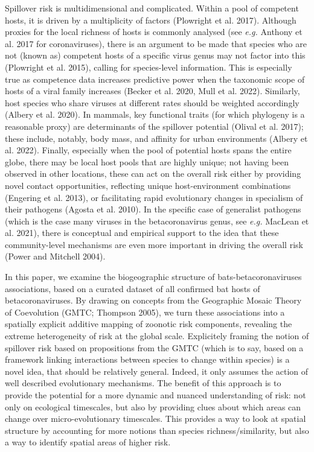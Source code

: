 \documentclass[11pt]{article}
\begin{document}
\vfill

\clearpage
\linenumbers
\pagestyle{normal}

Spillover risk is multidimensional and complicated. Within a pool of
competent hosts, it is driven by a multiplicity of factors (Plowright et
al. 2017). Although proxies for the local richness of hosts is commonly
analysed (see \emph{e.g.} Anthony et al. 2017 for coronaviruses), there
is an argument to be made that species who are not (known as) competent
hosts of a specific virus genus may not factor into this (Plowright et
al. 2015), calling for species-level information. This is especially
true as competence data increases predictive power when the taxonomic
scope of hosts of a viral family increases (Becker et al. 2020, Mull et
al. 2022). Similarly, host species who share viruses at different rates
should be weighted accordingly (Albery et al. 2020). In mammals, key
functional traits (for which phylogeny is a reasonable proxy) are
determinants of the spillover potential (Olival et al. 2017); these
include, notably, body mass, and affinity for urban environments (Albery
et al. 2022). Finally, especially when the pool of potential hosts spans
the entire globe, there may be local host pools that are highly unique;
not having been observed in other locations, these can act on the
overall risk either by providing novel contact opportunities, reflecting
unique host-environment combinations (Engering et al. 2013), or
facilitating rapid evolutionary changes in specialism of their pathogens
(Agosta et al. 2010). In the specific case of generalist pathogens
(which is the case many viruses in the betacoronavirus genus, see
\emph{e.g.} MacLean et al. 2021), there is conceptual and empirical
support to the idea that these community-level mechanisms are even more
important in driving the overall risk (Power and Mitchell 2004).

In this paper, we examine the biogeographic structure of
bats-betacoronaviruses associations, based on a curated dataset of all
confirmed bat hosts of betacoronaviruses. By drawing on concepts from
the Geographic Mosaic Theory of Coevolution (GMTC; Thompson 2005), we
turn these associations into a spatially explicit additive mapping of
zoonotic risk components, revealing the extreme heterogeneity of risk at
the global scale. Explicitely framing the notion of spillover risk based
on propositions from the GMTC (which is to say, based on a framework
linking interactions between species to change within species) is a
novel idea, that should be relatively general. Indeed, it only assumes
the action of well described evolutionary mechanisms. The benefit of
this approach is to provide the potential for a more dynamic and nuanced
understanding of risk: not only on ecological timescales, but also by
providing clues about which areas can change over micro-evolutionary
timescales. This provides a way to look at spatial structure by
accounting for more notions than species richness/similarity, but also a
way to identify spatial areas of higher risk.
\end{document}
